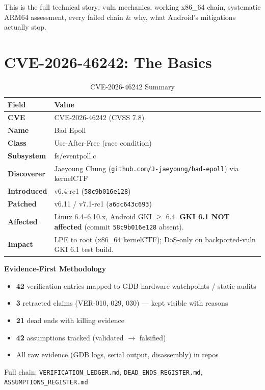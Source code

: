 \documentclass[11pt,a4paper]{article}
\newcommand{\inlinecode}[1]{\colorbox{codebg}{\ttfamily\small\color{keyword}#1}}
\begin{document}
This is the full technical story: vuln mechanics, working x86\_64 chain, systematic ARM64 assessment, every failed chain \& why, what Android's mitigations actually stop.

\section{CVE-2026-46242: The Basics}

\begin{table}[H]
\centering
\caption{CVE-2026-46242 Summary}
\label{tab:cve}
\begin{tabularx}{\textwidth}{>{\bfseries\color{accent}}l X}
\toprule
\textbf{Field} & \textbf{Value} \\
\midrule
CVE & CVE-2026-46242 (CVSS 7.8) \\
Name & Bad Epoll \\
Class & Use-After-Free (race condition) \\
Subsystem & \inlinecode{fs/eventpoll.c} \\
Discoverer & Jaeyoung Chung (\texttt{github.com/J-jaeyoung/bad-epoll}) via kernelCTF \\
Introduced & v6.4-rc1 (\texttt{58c9b016e128}) \\
Patched & v6.11 / v7.1-rc1 (\texttt{a6dc643c693}) \\
Affected & Linux 6.4--6.10.x, Android GKI $\ge$ 6.4. \textbf{GKI 6.1 NOT affected} (commit \texttt{58c9b016e128} absent). \\
Impact & LPE to root (x86\_64 kernelCTF); DoS-only on backported-vuln GKI 6.1 test build. \\
\bottomrule
\end{tabularx}
\end{table}

\begin{calloutbox}
\noindent\textbf{\large Evidence-First Methodology}
\begin{itemize}
  \item \textbf{42} verification entries mapped to GDB hardware watchpoints / static audits
  \item \textbf{3} retracted claims (VER-010, 029, 030) --- kept visible with reasons
  \item \textbf{21} dead ends with killing evidence
  \item \textbf{42} assumptions tracked (validated $\to$ falsified)
  \item All raw evidence (GDB logs, serial output, disassembly) in repos
\end{itemize}
Full chain: \texttt{VERIFICATION\_LEDGER.md}, \texttt{DEAD\_ENDS\_REGISTER.md}, \texttt{ASSUMPTIONS\_REGISTER.md}
\end{calloutbox}
\end{document}
